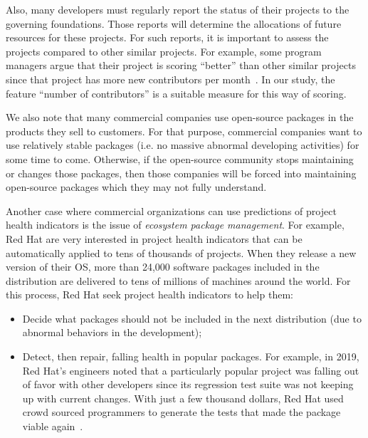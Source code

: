 \documentclass[smallextended]{svjour3}
\newcommand{\bi}{\begin{itemize}}
\newcommand{\ei}{\end{itemize}}
\begin{document}
Also, many developers must regularly report the status of their projects to the governing foundations. Those reports will determine the allocations of future resources for these projects. For such reports, it is important to assess the projects compared to other similar projects.
For example, some program managers argue that their project is scoring ``better'' than other similar projects since that project has more new contributors per month~\cite{xia21}. In our study, the feature ``number of contributors'' is a suitable measure for this way of scoring.


We also note that 
many commercial companies   use open-source packages in the products they sell to customers. For that purpose, commercial companies want to use relatively stable packages (i.e. no massive abnormal developing activities) for some time to come. Otherwise, if the open-source community stops maintaining or changes those
packages, then those companies
will be forced into maintaining open-source packages which they may not fully understand.

Another case where commercial organizations can use predictions of project health indicators is the issue
of {\em ecosystem package management}.
For example, Red Hat are very interested in project health indicators that can be automatically applied to tens of thousands of projects. 
 When they release a new version of their OS, more than 24,000 software packages included in the distribution are   delivered to tens of millions of machines around the world.  For this process, Red Hat seek project health indicators to help them:
\bi
\item Decide what packages should not be included in the next distribution (due to abnormal behaviors in the development);
\item Detect, then repair, falling health in   popular packages.
For example, in 2019, Red Hat's engineers
noted that a particularly popular  project was falling out of favor with other developers since its regression test suite was not keeping up with current changes. With just a few thousand dollars, Red Hat used crowd sourced programmers
to generate the tests that made the package viable again~\cite{stewart19}.
\ei 
\end{document}
